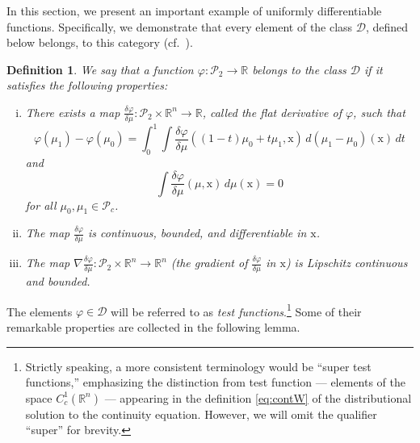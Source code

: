 \documentclass[sn-mathphys-num]{sn-jnl}
\numberwithin{equation}{section}
\theoremstyle{mythm}
\theoremstyle{mydef}
\newtheorem{definition}[proposition]{Definition}
\renewcommand{\phi}{\varphi}
\renewcommand{\d}{\,d}
\begin{document}
In this section, we present an important example of uniformly differentiable functions. Specifically, we demonstrate that every element of the class \( \bm{\mathcal D} \), defined below belongs, to this category (cf.~\cite{CardMaster2019}).

\begin{definition}
  We say that a function \( \phi\colon \mathcal{P}_2\to \mathbb{R} \) belongs to the class \( \bm{\mathcal D} \) if it satisfies the following properties:
\begin{enumerate}[(i)]
  \item There exists a map \( \frac{\delta \phi}{\delta \mu}\colon \mathcal{P}_2 \times \mathbb{R}^n\to \mathbb{R} \), called the flat derivative of \( \phi \), such that
\[
  \phi(\mu_{1}) - \phi(\mu_{0}) = \int_0^1\int \frac{\delta \phi}{\delta\mu}\left((1-t)\mu_0 + t\mu_1,\mathrm{x}\right)\d (\mu_1-\mu_0)(\mathrm{x})\d t
\]
and
    \[
    \int \frac{\delta \phi}{\delta \mu}(\mu,\mathrm{x})\d \mu(\mathrm{x}) = 0
        \]
        for all \( \mu_0,\mu_1\in \mathcal{P}_c \).

\smallskip
        
      \item The map \( \frac{\delta \phi}{\delta \mu} \) is continuous, bounded, and differentiable in \( \mathrm{x} \).

\smallskip

      \item The map \( \nabla\frac{\delta \phi}{\delta \mu} \colon \mathcal{P}_2 \times \mathbb{R}^n\to \mathbb{R}^n\) (the gradient of \( \frac{\delta \phi}{\delta \mu} \) in \( \mathrm{x} \)) is Lipschitz continuous and bounded.
\end{enumerate}
\end{definition}


The elements \(\phi \in \bm{\mathcal D}\) will be referred to as \emph{test functions}.\footnote{Strictly speaking, a more consistent terminology would be ``super test functions,'' emphasizing the distinction from test function --- elements of the space $ C^1_c(\mathbb{R}^n)$ --- appearing in the definition \eqref{eq:contW} of the distributional solution to the continuity equation. However, we will omit the qualifier ``super'' for brevity.}
Some of their remarkable properties are collected in the following lemma.
\end{document}
